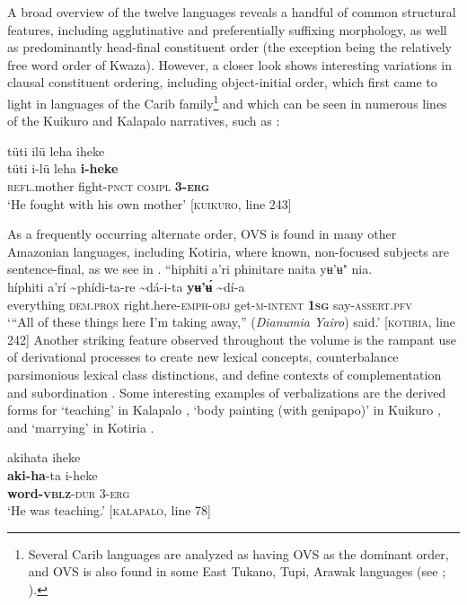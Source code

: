 \documentclass[output=paper,
modfonts,nonflat
]{langsci/langscibook}
\begin{document}
A broad overview of the twelve languages reveals a handful of common structural features, including agglutinative and preferentially suffixing morphology, as well as predominantly head-final constituent order (the exception being the relatively free word order of Kwaza). However, a closer look shows interesting variations in clausal constituent ordering, including object-initial order, which first came to light in languages of the Carib family\footnote{Several Carib languages are analyzed as having OVS as the dominant order, and OVS is also found in some East Tukano, Tupi, Arawak languages (see \citealt[155]{Derbyshire1999}; \citealt[273--275]{Campbell2012}).} and which can be seen in numerous lines of the Kuikuro and Kalapalo narratives, such as : 

\ea\label{ex:intro:1} tüti ilü leha iheke \\[.3em]
\gll  tüti i-lü leha \textbf{i-heke} \\
\textsc{refl.}mother fight-\textsc{pnct} \textsc{compl} \textsc{\textbf{3-erg}} \\
\glt ‘He fought with his own mother’ [\textsc{kuikuro}, line 243]
\z 

\newpage 
As a frequently occurring alternate order, OVS is found in many other Amazonian languages, including Kotiria, where known, non-focused subjects are sentence-final, as we see in .
\ea\label{ex:intro:2} “hiphiti a’ri phinitare naita yʉ’ʉ" nia.  \\[.3em]
\gll híphiti	a’rí	{\textasciitilde}phídi-ta-re	{\textasciitilde}dá-i-ta 	\textbf{yʉ’ʉ́}	{\textasciitilde}dí-a \\
     everything	\textsc{dem.prox}	right.here-\textsc{emph-obj}	get-\textsc{m-intent}	\textbf{1\textsc{sg}}	say-\textsc{assert.pfv}\\
\glt ‘“All of these things here I'm taking away,” (\textit{Dianumia Yairo}) said.’ [\textsc{kotiria}, line 242]
\z 
Another striking feature observed throughout the volume is the rampant use of derivational processes to create new lexical concepts, counterbalance parsimonious lexical class distinctions, and define contexts of complementation and subordination \citep{vanGijn2011,Bruno2011}. Some interesting examples of verbalizations are the derived forms for ‘teaching’ in Kalapalo , ‘body painting (with genipapo)’ in Kuikuro , and ‘marrying’ in Kotiria .
    
\ea\label{ex:intro:3}  akihata iheke\\[.3em]
\gll \textbf{aki-ha}-ta i-heke\\
     \textbf{word-\textsc{vblz}}-\textsc{dur} 3-\textsc{erg}\\
\glt ‘He was teaching.’ [\textsc{kalapalo}, line 78] 
\z 
\end{document}

